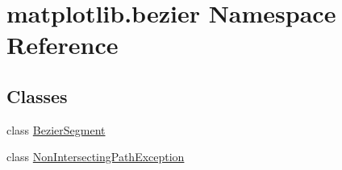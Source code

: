 \hypertarget{namespacematplotlib_1_1bezier}{}\section{matplotlib.\+bezier Namespace Reference}
\label{namespacematplotlib_1_1bezier}
\subsection*{Classes}
\begin{DoxyCompactItemize}
\item 
class \hyperlink{classmatplotlib_1_1bezier_1_1BezierSegment}{Bezier\+Segment}
\item 
class \hyperlink{classmatplotlib_1_1bezier_1_1NonIntersectingPathException}{Non\+Intersecting\+Path\+Exception}
\end{DoxyCompactItemize}
